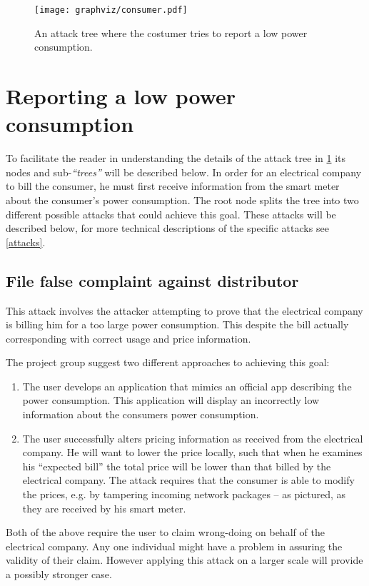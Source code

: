 
\begin{figure}
  \texttt{[image: graphviz/consumer.pdf]}
  \caption{An attack tree where the costumer tries to report a low power consumption.}
  \label{report_power_attack_tree}
\end{figure}

\section{Reporting a low power consumption}
To facilitate the reader in understanding the details of the attack tree in \cref{report_power_attack_tree} its nodes and sub-\emph{``trees''} will be described below.
In order for an electrical company to bill the consumer, he must first receive information from the smart meter about the consumer's power consumption.
The root node splits the tree into two different possible attacks that could achieve this goal.
These attacks will be described below, for more technical descriptions of the specific attacks see \cref{attacks}.

\subsection{File false complaint against distributor}
This attack involves the attacker attempting to prove that the electrical company is billing him for a too large power consumption.
This despite the bill actually corresponding with correct usage and price information.

The project group suggest two different approaches to achieving this goal:
\begin{enumerate}
  \item The user develops an application that mimics an official app describing the power consumption.
  This application will display an incorrectly low information about the consumers power consumption.
  \item The user successfully alters pricing information as received from the electrical company.
  He will want to lower the price locally, such that when he examines his ``expected bill'' the total price will be lower than that billed by the electrical company.
  The attack requires that the consumer is able to modify the prices, e.g. by tampering incoming network packages -- as pictured, as they are received by his smart meter.
\end{enumerate}
Both of the above require the user to claim wrong-doing on behalf of the electrical company.
Any one individual might have a problem in assuring the validity of their claim.
However applying this attack on a larger scale will provide a possibly stronger case.

